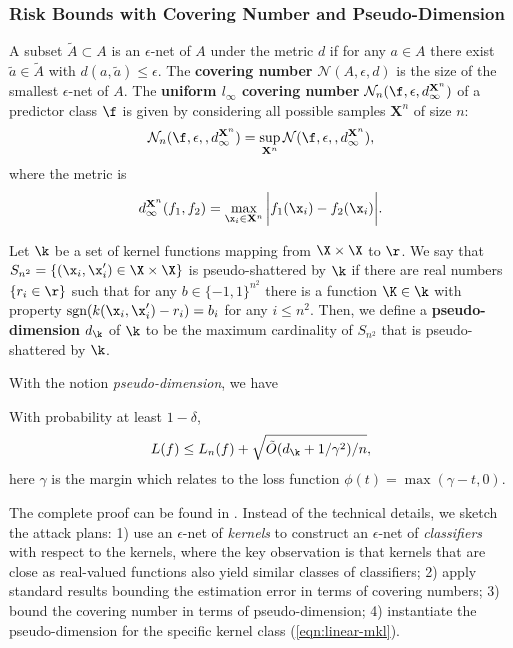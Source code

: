 \subsubsection{Risk Bounds with Covering Number and Pseudo-Dimension}

\begin{definition} \label{def:cov-num}
A subset $\tilde{A} \subset A$ is an $\epsilon$-net of $A$ under the metric $d$ if for
any $a\in A$ there exist $\tilde{a} \in \tilde{A}$ with $d(a, \tilde{a}) \leq \epsilon$.
The {\bf covering number} $\mathcal N(A, \epsilon, d)$ is the size of the smallest
$\epsilon$-net of $A$. The {\bf uniform $l_\infty$ covering number} $\mathcal
N_n(\f, \epsilon, d^{\mathbf X^n}_\infty)$ of a predictor class $\f$ is given by
considering all possible samples $\mathbf X^n$ of size $n$:
\[
\mathcal N_n(\f, \epsilon, , d^{\mathbf X^n}_\infty) = \sup_{\mathbf X^n}\mathcal N(\f, \epsilon, , d^{\mathbf X^n}_\infty),
\]
where the metric is
\[
d_{\infty}^{\mathbf X^n}(f_1, f_2) = \max_{\x_i \in \mathbf X^n}\bigg| f_1(\x_i) - f_2(\x_i) \bigg|.
\]
\end{definition}

\begin{definition} \label{def:pseudo-dim}
Let $\k$ be a set of kernel functions mapping from $\X\times\X$ to $\r$. We say that
$S_{n^2} = \{(\x_i, \x_i') \in \X\times\X \}$ is pseudo-shattered by $\k$ if there are
real numbers $\{r_i \in \r \}$ such that for any $b \in \{-1, 1\}^{n^2}$ there is a
function $\K \in \k$ with property $\mbox{sgn}(k(\x_i, \x_i') - r_i) = b_i$ for any $i\leq n^2$. Then, we define a {\bf pseudo-dimension} $d_{\k}$ of $\k$ to be the maximum cardinality of $S_{n^2}$ that is pseudo-shattered by $\k$.
\end{definition}

With the notion {\em pseudo-dimension}, we have
\begin{theorem} \label{thm:bnd-psdim-phi} \cite{colt/SrebroB06}
With probability at least $1 - \delta$,
\[
L(f) \leq L_n(f) + \sqrt{\tilde{O}(d_{\k} + 1 / \gamma^2) / n},
\]
here $\gamma$ is the margin which relates to the loss function $\phi(t) =
\max(\gamma - t, 0)$.
\end{theorem}

The complete proof can be found in \cite{colt/SrebroB06}. Instead of the technical
details, we sketch the attack plans: 1) use an $\epsilon$-net of {\em kernels} to
construct an $\epsilon$-net of {\em classifiers} with respect to the kernels, where the
key observation is that kernels that are close as real-valued functions also yield similar
classes of classifiers; 2) apply standard results bounding the estimation error in terms of
covering numbers; 3) bound the covering number  in terms of pseudo-dimension; 4)
instantiate the pseudo-dimension for the specific kernel class (\ref{eqn:linear-mkl}).

